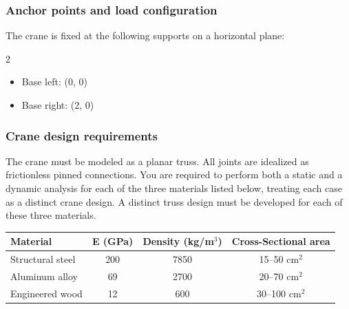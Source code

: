 \documentclass[12pt]{article}
\begin{document}
\subsubsection*{Anchor points and load configuration}
The crane is fixed at the following supports on a horizontal plane:
\begin{multicols}{2}
  \begin{itemize}
    \item Base left: (0, 0)
    \item Base right: (2, 0)
  \end{itemize}
\end{multicols}

\begin{center}
\end{center}

\subsubsection*{Crane design requirements}
The crane must be modeled as a planar truss. All joints are idealized as frictionless pinned connections. You are required to perform both a static and a dynamic analysis for each of the three materials listed below, treating each case as a distinct crane design. A distinct truss design must be developed for each of these three materials.
\begin{center}
  \begin{tabular}{l|c|c|c}
    {Material}       & {E (GPa)} & {Density (kg/m$^3$)} & {Cross-Sectional area} \\
    \hline
    Structural steel & 200       & 7850                 & 15–50 cm$^2$           \\
    Aluminum alloy   & 69        & 2700                 & 20–70 cm$^2$           \\
    Engineered wood  & 12        & 600                  & 30–100 cm$^2$          \\
  \end{tabular}
\end{center}
\end{document}
